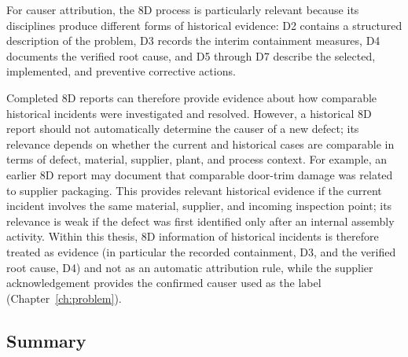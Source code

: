 For causer attribution, the 8D process is particularly relevant because
its disciplines produce different forms of historical evidence: D2
contains a structured description of the problem, D3 records the interim
containment measures, D4 documents the verified root cause, and D5
through D7 describe the selected, implemented, and preventive corrective
actions.

Completed 8D reports can therefore provide evidence about how comparable
historical incidents were investigated and resolved. However, a
historical 8D report should not automatically determine the causer of a
new defect; its relevance depends on whether the current and historical
cases are comparable in terms of defect, material, supplier, plant, and
process context. For example, an earlier 8D report may document that
comparable door-trim damage was related to supplier packaging. This
provides relevant historical evidence if the current incident involves
the same material, supplier, and incoming inspection point; its relevance
is weak if the defect was first identified only after an internal
assembly activity. Within this thesis, 8D information of historical
incidents is therefore treated as evidence (in particular the recorded
containment, D3, and the verified root cause, D4) and not as an automatic
attribution rule, while the supplier acknowledgement provides the
confirmed causer used as the label (Chapter~\ref{ch:problem}).

\subsection{Summary}\label{sec:fund_bmw_summary}


